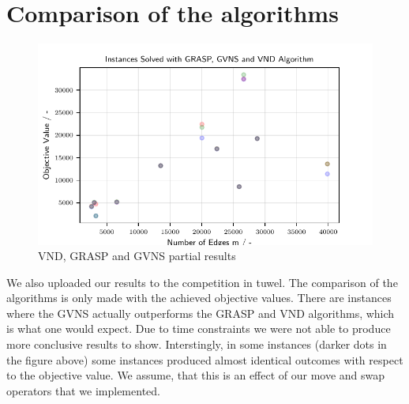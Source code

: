 \section{Comparison of the algorithms}
\label{sec:comp_of_algos}

\begin{figure}[h]
    \centering
    \includegraphics[width=\linewidth, trim= {0 0cm 0 0cm}, clip]{figures/vnd_grasp_gvns_edges_vs_obj.pdf}
    \caption{\label{fig:types}VND, GRASP and GVNS partial results}
\end{figure}

We also uploaded our results to the competition in tuwel.
The comparison of the algorithms is only made with the achieved objective values. There are instances where the 
GVNS actually outperforms the GRASP and VND algorithms, which is what one would expect. Due to time constraints
 we were not able to produce more conclusive results to show. Interstingly, in some instances (darker dots in the 
 figure above) some instances produced almost identical outcomes with respect to the objective value. We assume, 
 that this is an effect of our move and swap operators that we implemented.


